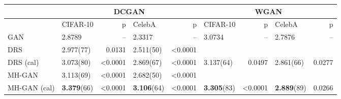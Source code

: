 \documentclass{article}
\begin{document}

\begin{center}
{\scriptsize
\begin{tabular}{|l|l|r|l|r||l|r|l|r|}
\toprule
~                 & \multicolumn{4}{c||}{DCGAN}                               & \multicolumn{4}{c|}{WGAN} \\
\toprule
~            & {CIFAR-10}                &      p   & CelebA                  &      p   & CIFAR-10                 &       p  & CelebA                 &       p  \\
\midrule
GAN          &        2.8789             &       -- &      2.3317             &       -- &       3.0734             &       -- &     2.7876             &       -- \\
DRS          &        2.977(77)          &   0.0131 &      2.511(50)          &  <0.0001 &               ~          &        ~ &             ~          &        ~ \\
DRS (cal)    &        3.073(80)          &  <0.0001 &      2.869(67)          &  <0.0001 &       3.137(64)          &   0.0497 &     2.861(66)          &   0.0277 \\
MH-GAN       &        3.113(69)          &  <0.0001 &      2.682(50)          &  <0.0001 &               ~          &        ~ &             ~          &        ~ \\
MH-GAN (cal) &        \textbf{3.379}(66) &  <0.0001 &      \textbf{3.106}(64) &  <0.0001 &       \textbf{3.305}(83) &  <0.0001 &     \textbf{2.889}(89) &   0.0266 \\
\bottomrule
\end{tabular}
}
\end{center}

\end{document}
